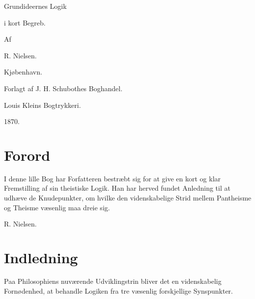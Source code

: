 \documentclass[12pt]{book}
\begin{document}
\begin{titlepage}
\centering
{\Huge Grundideernes Logik\par}
\vspace{1ex}
{\Large i kort Begreb.\par}
\vspace{4ex}
{\large Af\par}
\vspace{2ex}
{\LARGE R. Nielsen.\par}
\vfill
{\large Kjøbenhavn.\par}
{\large Forlagt af J. H. Schubothes Boghandel.\par}
{\large Louis Kleins Bogtrykkeri.\par}
{\large 1870.\par}
\end{titlepage}

\frontmatter

\chapter*{Forord}
I denne lille Bog har Forfatteren bestræbt sig for at give
en kort og klar Fremstilling af sin theistiske Logik. Han har
herved fundet Anledning til at udhæve de Knudepunkter, om
hvilke den videnskabelige Strid mellem Pantheisme og Theisme
væsenlig maa dreie sig.

\begin{flushright}R. Nielsen.\end{flushright}


\chapter*{Indledning}

Paa Philosophiens nuværende Udviklingstrin bliver det en videnskabelig
Fornødenhed, at behandle Logiken fra tre væsenlig forskjellige Synspunkter.
\end{document}
